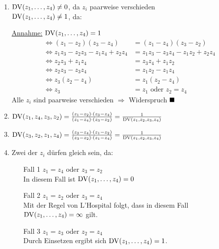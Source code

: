 \begin{beweis}\leavevmode
    \begin{enumerate}[label=\alph*)]
        \item $\operatorname{DV}(z_1, \dots, z_4) \neq 0$, da $z_i$ paarweise verschieden\\
              $\operatorname{DV}(z_1, \dots, z_4) \neq 1$, da:

            \begin{adjustwidth}{2.5em}{0pt}
                \underline{Annahme:} $\operatorname{DV}(z_1, \dots, z_4) = 1$
                \begin{align*}
                    \Leftrightarrow (z_1 - z_2) (z_3 - z_4) &= (z_1 - z_4) (z_3 - z_2)\\
                    \Leftrightarrow z_1 z_3 - z_2 z_3 - z_1 z_4 + z_2 z_4 &= z_1 z_3 - z_3 z_4 - z_1 z_2 + z_2 z_4\\
                    \Leftrightarrow z_2 z_3 + z_1 z_4 &= z_3 z_4 + z_1 z_2\\
                    \Leftrightarrow z_2 z_3 - z_3 z_4 &= z_1 z_2 - z_1 z_4\\
                    \Leftrightarrow z_3 (z_2 - z_4) &= z_1 (z_2 - z_4)\\
                    \Leftrightarrow z_3 &= z_1 \text{ oder } z_2 = z_4
                \end{align*}
                Alle $z_i$ sind paarweise verschieden $\Rightarrow$ Widerspruch $\qed$
            \end{adjustwidth}
        \item $\operatorname{DV}(z_1, z_4, z_3, z_2) = \frac{(z_1 - z_2) \cdot (z_3 - z_4)}{(z_1 - z_4) \cdot (z_3 - z_2)} = \frac{1}{\operatorname{DV}(z_1, z_2, z_3, z_4)}$
        \item $\operatorname{DV}(z_3, z_2, z_1, z_4) = \frac{(z_3 - z_4) \cdot (z_1 - z_2)}{(z_3 - z_2) \cdot (z_1 - z_4)} = \frac{1}{\operatorname{DV}(z_1, z_2, z_3, z_4)}$
        \item Zwei der $z_i$ dürfen gleich sein, da:
            \begin{itemize}
                \item[Fall 1] $z_1 = z_4$ oder $z_3 = z_2$\\
                    In diesem Fall ist $\operatorname{DV}(z_1, \dots, z_4) = 0$
                \item[Fall 2] $z_1 = z_2$ oder $z_3 = z_4$\\
                    Mit der Regel von L'Hospital folgt, dass in diesem
                    Fall $\operatorname{DV}(z_1, \dots, z_4) = \infty$ gilt.
                \item[Fall 3] $z_1 = z_3$ oder $z_2 = z_4$\\
                    Durch Einsetzen ergibt sich $\operatorname{DV}(z_1, \dots, z_4)=1$.
            \end{itemize}


\end{enumerate}
\end{beweis}
